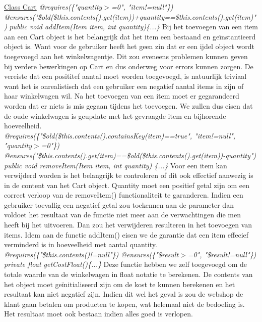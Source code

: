 \documentclass{article}
\begin{document}
\underline{Class Cart}\newline
\textit{@requires(\{"quantity$>$=0", "item!=null"\})}\newline
\textit{@ensures("\$old(\$this.contents().get(item))+quantity==\$this.contents().get(item)")}\newline
\textit{public void addItem(Item item, int quantity)\{...\}}\newline
Bij het toevoegen van een item aan een Cart object is het belangrijk dat het item een bestaand en geïnstantieerd object is. Want voor de gebruiker heeft het geen zin dat er een ijdel object wordt toegevoegd aan het winkelwagentje. Dit zou eveneens problemen kunnen geven bij verdere bewerkingen op Cart en dus onderweg voor errors kunnen zorgen. De vereiste dat een posititef aantal moet worden toegevoegd, is natuurlijk triviaal want het is onrealistisch dat een gebruiker een negatief aantal items in zijn of haar winkelwagen wil.\newline
Na het toevoegen van een item moet er gegarandeerd worden dat er niets is mis gegaan tijdens het toevoegen. We zullen dus eisen dat de oude winkelwagen is geupdate met het gevraagde item en bijhorende hoeveelheid. \\

\noindent
\textit{@requires(\{"\$old(\$this.contents().containsKey(item)==true", "item!=null", "quantity$>$=0"\})} \newline
\textit{@ensures("\$this.contents().get(item)==\$old(\$this.contents().get(item))-quantity")} \newline
\textit{public void removeItem(Item item, int quantity) \{...\}} \newline
Voor een item kan verwijderd worden is het belangrijk te controleren of dit ook effectief aanwezig is in de content van het Cart object. Quantity moet een positief getal zijn om een correct verloop van de removeItem() functionaliteit te garanderen. Indien een gebruiker toevallig een negatief getal zou toekennen aan de parameter dan voldoet het resultaat van de functie niet meer aan de verwachtingen die men heeft bij het uitvoeren. Dan zou het verwijderen resulteren in het toevoegen van items. Idem aan de functie addItem() eisen we de garantie dat een item effecief verminderd is in hoeveelheid met aantal quantity. \\

\noindent
\textit{@requires(\{"\$this.contents()!=null"\})}\newline
\textit{@ensures(\{"\$result$>$=0", "\$result!=null"\})}\newline
\textit{private float getCostFloat()\{...\}}\newline
Deze functie hebben we zelf toegevoegd om de totale waarde van de winkelwagen in float notatie te berekenen. De contents van het object moet geïnitialiseerd zijn om de kost te kunnen berekenen en het resultaat kan niet negatief zijn. Indien dit wel het geval is zou de webshop de klant gaan betalen om producten te kopen, wat helemaal niet de bedoeling is. Het resultaat moet ook bestaan indien alles goed is verlopen.\\
\end{document}
